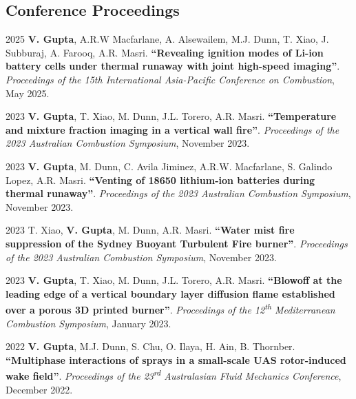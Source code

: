 \documentclass[12pt,letterpaper]{report}
\begin{document}
 \subsection*{Conference Proceedings}
	
	\begin{tablist}	

        \item[2025] \tab \textbf{V. Gupta}, A.R.W Macfarlane, A. Alsewailem, M.J. Dunn, T. Xiao, J. Subburaj, A. Farooq, A.R. Masri. \textbf{\enquote{Revealing ignition modes of Li-ion battery cells under thermal runaway with joint high-speed imaging}}. \textit{Proceedings of the 15th International Asia-Pacific Conference on Combustion}, May 2025.

        \item[2023] \tab \textbf{V. Gupta}, T. Xiao, M. Dunn, J.L. Torero, A.R. Masri. \textbf{\enquote{\textbf{Temperature and mixture fraction imaging in a vertical wall fire}}}. \textit{Proceedings of the 2023 Australian Combustion Symposium}, November 2023.

        \item[2023] \tab \textbf{V. Gupta}, M. Dunn, C. Avila Jiminez, A.R.W. Macfarlane, S. Galindo Lopez, A.R. Masri. \textbf{\enquote{\textbf{Venting of 18650 lithium-ion batteries during thermal runaway}}}. \textit{Proceedings of the 2023 Australian Combustion Symposium}, November 2023.

        \item[2023] \tab T. Xiao, \textbf{V. Gupta}, M. Dunn, A.R. Masri. \textbf{\enquote{\textbf{Water mist fire suppression of the Sydney Buoyant Turbulent Fire burner}}}. \textit{Proceedings of the 2023 Australian Combustion Symposium}, November 2023.
        
        \item[2023] \tab \textbf{V. Gupta}, T. Xiao, M. Dunn, J.L. Torero, A.R. Masri. \textbf{\enquote{\textbf{Blowoff at the leading edge of a vertical boundary layer diffusion flame established over a porous 3D printed burner}}}. \textit{Proceedings of the 12\textsuperscript{th} Mediterranean Combustion Symposium}, January 2023.

		\item[2022] \tab \textbf{V. Gupta}, M.J. Dunn, S. Chu, O. Ilaya, H. Ain, B. Thornber. \textbf{\enquote{\textbf{Multiphase interactions of sprays in a small-scale UAS rotor-induced wake field}}}. \textit{Proceedings of the 23\textsuperscript{rd} Australasian Fluid Mechanics Conference}, December 2022.
		

\end{tablist}
\end{document}
